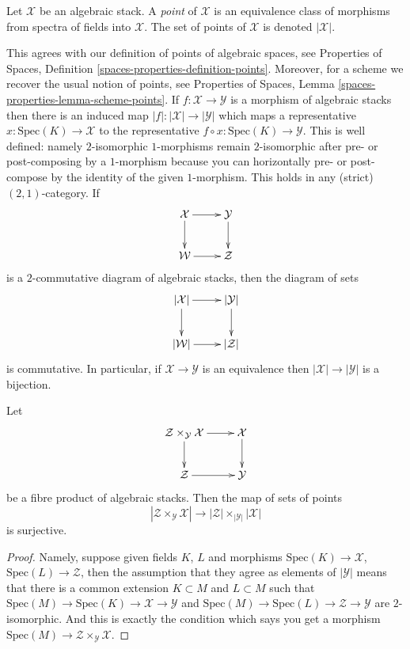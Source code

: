 \begin{definition}
\label{definition-points}
Let $\mathcal{X}$ be an algebraic stack.
A {\it point} of $\mathcal{X}$ is an equivalence class of morphisms
from spectra of fields into $\mathcal{X}$.
The set of points of $\mathcal{X}$ is denoted $|\mathcal{X}|$.
\end{definition}

\noindent
This agrees with our definition of points of algebraic spaces, see
Properties of Spaces, Definition \ref{spaces-properties-definition-points}.
Moreover, for a scheme we recover the usual notion of points, see
Properties of Spaces, Lemma \ref{spaces-properties-lemma-scheme-points}.
If $f : \mathcal{X} \to \mathcal{Y}$ is a morphism of algebraic stacks
then there is an induced map $|f| : |\mathcal{X}| \to |\mathcal{Y}|$ which
maps a representative $x : \text{Spec}(K) \to \mathcal{X}$ to the
representative $f \circ x : \text{Spec}(K) \to \mathcal{Y}$. This is
well defined: namely $2$-isomorphic $1$-morphisms remain $2$-isomorphic after
pre- or post-composing by a $1$-morphism because you can horizontally
pre- or post-compose by the identity of the given $1$-morphism. This holds
in any (strict) $(2,1)$-category. If
$$
\xymatrix{
\mathcal{X} \ar[d] \ar[r] & \mathcal{Y} \ar[d] \\
\mathcal{W} \ar[r] & \mathcal{Z}
}
$$
is a $2$-commutative diagram of algebraic stacks, then the diagram
of sets
$$
\xymatrix{
|\mathcal{X}| \ar[d] \ar[r] & |\mathcal{Y}| \ar[d] \\
|\mathcal{W}| \ar[r] & |\mathcal{Z}|
}
$$
is commutative.
In particular, if $\mathcal{X} \to \mathcal{Y}$ is an equivalence
then $|\mathcal{X}| \to |\mathcal{Y}|$ is a bijection.

\begin{lemma}
\label{lemma-points-cartesian}
Let
$$
\xymatrix{
\mathcal{Z} \times_{\mathcal{Y}} \mathcal{X} \ar[r] \ar[d] &
\mathcal{X} \ar[d] \\
\mathcal{Z} \ar[r] & \mathcal{Y}
}
$$
be a fibre product of algebraic stacks. Then the map of sets
of points
$$
|\mathcal{Z} \times_{\mathcal{Y}} \mathcal{X}|
\longrightarrow
|\mathcal{Z}| \times_{|\mathcal{Y}|} |\mathcal{X}|
$$
is surjective.
\end{lemma}

\begin{proof}
Namely, suppose given fields $K$, $L$ and morphisms
$\text{Spec}(K) \to \mathcal{X}$, $\text{Spec}(L) \to \mathcal{Z}$,
then the assumption that they agree as elements of $|\mathcal{Y}|$ means that
there is a common extension $K \subset M$ and $L \subset M$
such that
$\text{Spec}(M) \to \text{Spec}(K) \to \mathcal{X} \to \mathcal{Y}$ and
$\text{Spec}(M) \to \text{Spec}(L) \to \mathcal{Z} \to \mathcal{Y}$
are $2$-isomorphic. And this is exactly the condition which says you get a
morphism $\text{Spec}(M) \to \mathcal{Z} \times_{\mathcal{Y}} \mathcal{X}$.
\end{proof}

